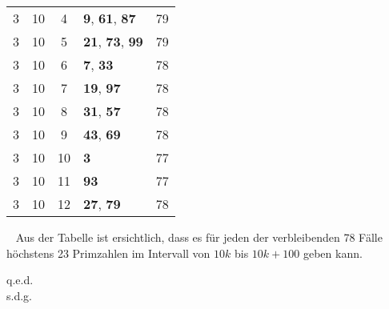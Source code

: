 \documentclass{article}
\newcommand{\myqed}{\begin{flushright} q.e.d.\\ s.d.g.\end{flushright}}
\begin{document}
\begin{minipage}[t]{0.5\textwidth}
\begin{flushleft}
\begin{tabular}{||c|c|c|l|c||}
	3&10&4&\textbf{9}, \textbf{61}, \textbf{87}&79\\
	3&10&5&\textbf{21}, \textbf{73}, \textbf{99}&79\\
	3&10&6&\textbf{7}, \textbf{33}&78\\
	3&10&7&\textbf{19}, \textbf{97}&78\\
	3&10&8&\textbf{31}, \textbf{57}&78\\
	3&10&9&\textbf{43}, \textbf{69}&78\\
	3&10&10&\textbf{3}&77\\
	3&10&11&\textbf{93}&77\\
	3&10&12&\textbf{27}, \textbf{79}&78\\
\end{tabular}
\end{flushleft}
\end{minipage}
\ \newline
    Aus der Tabelle ist ersichtlich, dass es für jeden der verbleibenden 78 Fälle höchstens 23 Primzahlen im Intervall von $10k$ bis $10k+100$ geben kann.\myqed
\end{document}
